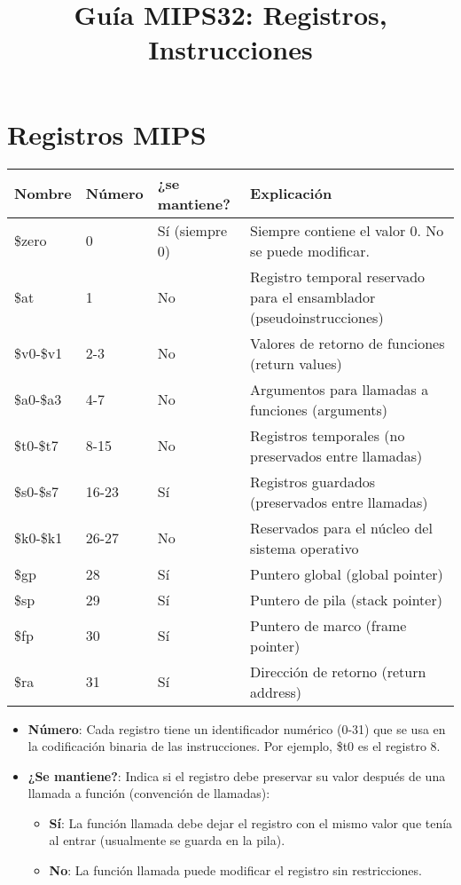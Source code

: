 \documentclass{article}
\title{Guía MIPS32: Registros, Instrucciones}
\begin{document}
\maketitle

\section{Registros MIPS}

\begin{table}[h]
\centering

\begin{tabular}{lllp{6cm}}
\toprule
\textbf{Nombre} & \textbf{Número} & \textbf{¿se mantiene?} & \textbf{Explicación} \\
\midrule
\$zero & 0 & Sí (siempre 0) & Siempre contiene el valor 0. No se puede modificar. \\
\$at & 1 & No & Registro temporal reservado para el ensamblador (pseudoinstrucciones) \\
\$v0-\$v1 & 2-3 & No & Valores de retorno de funciones (return values) \\
\$a0-\$a3 & 4-7 & No & Argumentos para llamadas a funciones (arguments) \\
\$t0-\$t7 & 8-15 & No & Registros temporales (no preservados entre llamadas) \\
\$s0-\$s7 & 16-23 & Sí & Registros guardados (preservados entre llamadas) \\
\$k0-\$k1 & 26-27 & No & Reservados para el núcleo del sistema operativo \\
\$gp & 28 & Sí & Puntero global (global pointer) \\
\$sp & 29 & Sí & Puntero de pila (stack pointer) \\
\$fp & 30 & Sí & Puntero de marco (frame pointer) \\
\$ra & 31 & Sí & Dirección de retorno (return address) \\
\bottomrule
\end{tabular}
\end{table}

\begin{itemize}
\item \textbf{Número}: Cada registro tiene un identificador numérico (0-31) que se usa en la codificación binaria de las instrucciones. Por ejemplo, \$t0 es el registro 8.

\item \textbf{¿Se mantiene?}: Indica si el registro debe preservar su valor después de una llamada a función (convención de llamadas):
\begin{itemize}
\item \textbf{Sí}: La función llamada debe dejar el registro con el mismo valor que tenía al entrar (usualmente se guarda en la pila).
\item \textbf{No}: La función llamada puede modificar el registro sin restricciones.
\end{itemize}
\end{itemize}
\end{document}
